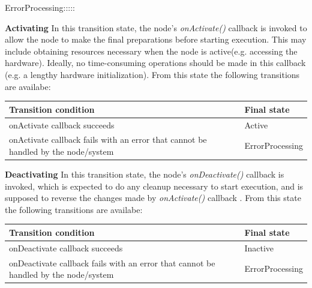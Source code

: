 \begin{labeling}{ErrorProcessing:::::}
		\item[\textbf{Activating}] In this transition state, the node's \textit{onActivate()} callback is invoked to allow the node to make the final preparations before starting execution. This may include obtaining resources necessary when the node is active(e.g. accessing the hardware). Ideally, no time-consuming operations should be made in this callback (e.g. a lengthy hardware initialization).
		From this state the following transitions are availabe:
		\begin{table}[H]
			\flushright
			\label{tab:Valid transitions}
			\begin{tabular}{|p{8.5cm}|p{3cm}|}
				\toprule
				Transition condition & Final state\\
				\midrule
				onActivate  callback succeeds & Active \\
				onActivate callback fails with an error that cannot be handled by the node/system  & ErrorProcessing \\
				\bottomrule
			\end{tabular}
		\end{table}

		\item[\textbf{Deactivating}] In this transition state, the node's \textit{onDeactivate()} callback is invoked, which is expected to do any cleanup necessary to start execution, and is supposed to reverse the changes made by \textit{onActivate()} callback .
		From this state the following transitions are availabe:
		\begin{table}[H]
			\flushright
			\label{tab:Valid transitions}
			\begin{tabular}{|p{8.5cm}|p{3cm}|}
				\toprule
				Transition condition & Final state\\
				\midrule
				onDeactivate callback succeeds & Inactive \\
				onDeactivate callback fails with an error that cannot be handled by the node/system  & ErrorProcessing \\
				\bottomrule
			\end{tabular}
		\end{table}


\end{labeling}
